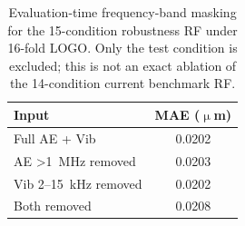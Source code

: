 \begin{table}[htbp]
\centering
\caption{Evaluation-time frequency-band masking for the 15-condition robustness RF under 16-fold LOGO. Only the test condition is excluded; this is not an exact ablation of the 14-condition current benchmark RF.}\label{tab:frequency-ablation}
\begin{tabular}{@{}lc@{}}
\toprule
Input & MAE ($\upmu$m) \\
\midrule
Full AE + Vib & 0.0202 \\
AE \textgreater 1~MHz removed & 0.0203 \\
Vib 2--15~kHz removed & 0.0202 \\
Both removed & 0.0208 \\
\bottomrule
\end{tabular}
\end{table}
